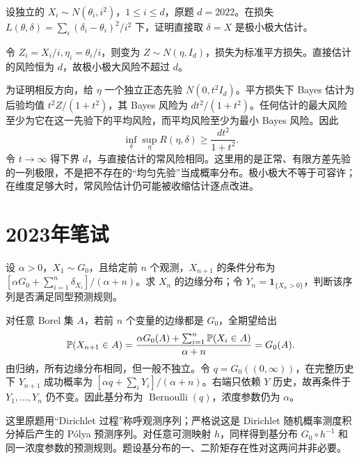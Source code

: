 \begin{example}[原题6：异方差正态均值的极小极大估计]\label{yau:2022-6}
设独立的 $X_i\sim N(\theta_i,i^2)$，$1\le i\le d$，原题 $d=2022$。在损失 $L(\theta,\delta)=\sum_i(\delta_i-\theta_i)^2/i^2$ 下，证明直接取 $\delta=X$ 是极小极大估计。
\end{example}
\begin{solve}
令 $Z_i=X_i/i,\eta_i=\theta_i/i$，则变为 $Z\sim N(\eta,I_d)$，损失为标准平方损失。直接估计的风险恒为 $d$，故极小极大风险不超过 $d$。

为证明相反方向，给 $\eta$ 一个独立正态先验 $N(0,t^2I_d)$。平方损失下 Bayes 估计为后验均值 $t^2Z/(1+t^2)$，其 Bayes 风险为 $dt^2/(1+t^2)$。任何估计的最大风险至少为它在这一先验下的平均风险，而平均风险至少为最小 Bayes 风险。因此
\[
\inf_\delta\sup_\eta R(\eta,\delta)\ge\frac{dt^2}{1+t^2}.
\]
令 $t\to\infty$ 得下界 $d$，与直接估计的常风险相同。这里用的是正常、有限方差先验的一列极限，不是把不存在的“均匀先验”当成概率分布。极小极大不等于可容许；在维度足够大时，常风险估计仍可能被收缩估计逐点改进。
\end{solve}


\section{2023年笔试}
\begin{example}[原题1：强化预测分布的边缘与映射]\label{yau:2023-1}
设 $\alpha>0$，$X_1\sim G_0$，且给定前 $n$ 个观测，$X_{n+1}$ 的条件分布为 $[\alpha G_0+\sum_{i=1}^n\delta_{X_i}]/(\alpha+n)$。求 $X_n$ 的边缘分布；令 $Y_n=\mathbf1_{\{X_n>0\}}$，判断该序列是否满足同型预测规则。
\end{example}
\begin{solve}
对任意 Borel 集 $A$，若前 $n$ 个变量的边缘都是 $G_0$，全期望给出
\[
\mathbb P(X_{n+1}\in A)=\frac{\alpha G_0(A)+\sum_{i=1}^n\mathbb P(X_i\in A)}{\alpha+n}=G_0(A).
\]
由归纳，所有边缘分布相同，但一般不独立。令 $q=G_0((0,\infty))$，在完整历史下 $Y_{n+1}$ 成功概率为 $[\alpha q+\sum_iY_i]/(\alpha+n)$。右端只依赖 $Y$ 历史，故再条件于 $Y_1,\ldots,Y_n$ 仍不变。因此基分布为 $\operatorname{Bernoulli}(q)$，浓度参数仍为 $\alpha$。

这里原题用“Dirichlet 过程”称呼观测序列；严格说这是 Dirichlet 随机概率测度积分掉后产生的 Pólya 预测序列。对任意可测映射 $h$，同样得到基分布 $G_0\circ h^{-1}$ 和同一浓度参数的预测规则。题设基分布的一、二阶矩存在性对这两问并非必要。
\end{solve}

